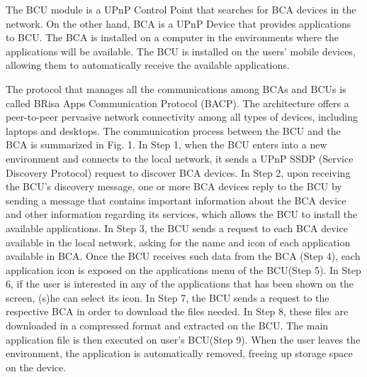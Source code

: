 \documentclass[journal]{IEEEtran}
\begin{document}
The BCU module is a UPnP Control Point that searches for BCA devices in the network. On the other hand, BCA is a UPnP Device that provides applications to BCU. The BCA is installed on a computer in the environments where the applications will be available. The BCU is installed on the users' mobile devices, allowing them to automatically receive the available applications.

The protocol that manages all the communications among BCAs and BCUs is called BRisa Apps Communication Protocol (BACP). The architecture offers a peer-to-peer pervasive network connectivity among all types of devices, including laptops and desktops. The communication process between the BCU and the BCA is summarized in Fig. 1. In Step 1, when the BCU enters into a new environment and connects to the local network, it sends a UPnP SSDP (Service Discovery Protocol) request to discover BCA devices. In Step 2, upon receiving the BCU's discovery message, one or more BCA devices reply to the BCU by sending a message that contains important information about the BCA device and other information regarding its services, which allows the BCU to install the available applications. In Step 3, the BCU sends a request to each BCA device available in the local network, asking for the name and icon of each application available in BCA. Once the BCU receives such data from the BCA (Step 4), each application icon is exposed on the applications menu of the BCU(Step 5). In Step 6, if the user is interested in any of the applications that has been shown on the screen, (s)he can select its icon. In Step 7, the BCU sends a request to the respective BCA in order to download the files needed. In Step 8, these files are downloaded in a compressed format and extracted on the BCU. The main application file is then executed on user's BCU(Step 9). When the user leaves the environment, the application is automatically removed, freeing up storage space on the device.
\end{document}
